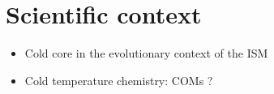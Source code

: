 \section{Scientific context} 
\begin{itemize}
\item{Cold core in the evolutionary context of the ISM}
\item{Cold temperature chemistry: COMs ?}
\end{itemize}
  
  
  
  
  